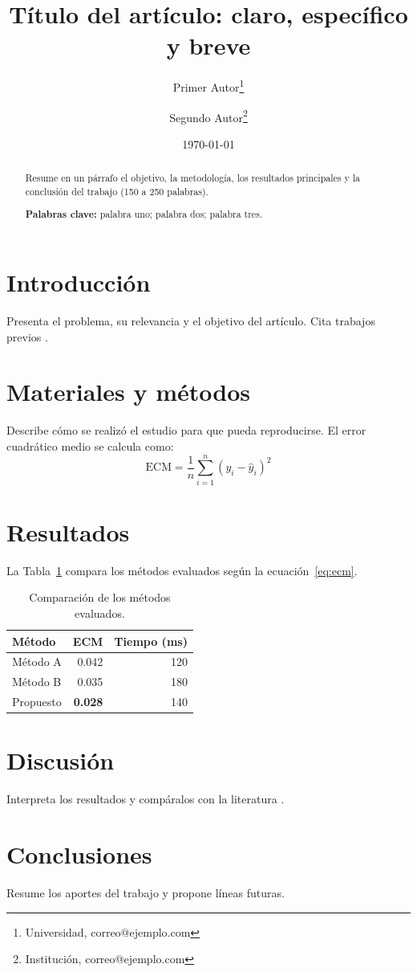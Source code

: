 \documentclass[11pt,a4paper]{article}
\title{Título del artículo: claro, específico y breve}
\author{
  Primer Autor\thanks{Universidad, correo@ejemplo.com} \and
  Segundo Autor\thanks{Institución, correo@ejemplo.com}
}
\date{\today}
\begin{document}
\maketitle

\begin{abstract}
Resume en un párrafo el objetivo, la metodología, los resultados principales y la
conclusión del trabajo (150 a 250 palabras).

\medskip
\noindent\textbf{Palabras clave:} palabra uno; palabra dos; palabra tres.
\end{abstract}

\section{Introducción}
Presenta el problema, su relevancia y el objetivo del artículo. Cita trabajos previos
\cite{lamport1994}.

\section{Materiales y métodos}
Describe cómo se realizó el estudio para que pueda reproducirse. El error cuadrático
medio se calcula como:
\begin{equation}
  \mathrm{ECM} = \frac{1}{n} \sum_{i=1}^{n} \left( y_i - \hat{y}_i \right)^2
  \label{eq:ecm}
\end{equation}

\section{Resultados}
La Tabla~\ref{tab:comparacion} compara los métodos evaluados según la
ecuación~\eqref{eq:ecm}.

\begin{table}[htbp]
  \centering
  \caption{Comparación de los métodos evaluados.}
  \label{tab:comparacion}
  \begin{tabular}{lrr}
    \toprule
    Método & ECM & Tiempo (ms) \\
    \midrule
    Método A & 0.042 & 120 \\
    Método B & 0.035 & 180 \\
    Propuesto & \textbf{0.028} & 140 \\
    \bottomrule
  \end{tabular}
\end{table}

\section{Discusión}
Interpreta los resultados y compáralos con la literatura \cite{knuth1984}.

\section{Conclusiones}
Resume los aportes del trabajo y propone líneas futuras.



\end{document}
